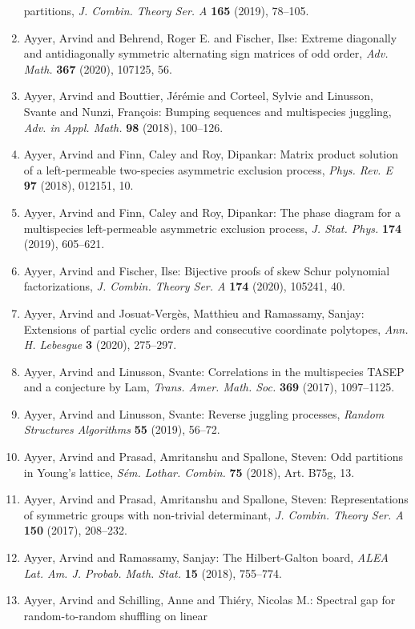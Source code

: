 \begin{enumerate}
partitions, \emph{J. Combin. Theory Ser. A} {\bf 165} (2019), 78--105.
\item Ayyer, Arvind and Behrend, Roger E. and Fischer, Ilse: Extreme diagonally and antidiagonally symmetric alternating
sign matrices of odd order, \emph{Adv. Math.} {\bf 367} (2020), 107125, 56.
\item Ayyer, Arvind and Bouttier, J\'{e}r\'{e}mie and Corteel, Sylvie and
Linusson, Svante and Nunzi, Fran\c{c}ois: Bumping sequences and multispecies juggling, \emph{Adv. in Appl. Math.} {\bf 98} (2018), 100--126.
\item Ayyer, Arvind and Finn, Caley and Roy, Dipankar: Matrix product solution of a left-permeable two-species
asymmetric exclusion process, \emph{Phys. Rev. E} {\bf 97} (2018), 012151, 10.
\item Ayyer, Arvind and Finn, Caley and Roy, Dipankar: The phase diagram for a multispecies left-permeable asymmetric
exclusion process, \emph{J. Stat. Phys.} {\bf 174} (2019), 605--621.
\item Ayyer, Arvind and Fischer, Ilse: Bijective proofs of skew {S}chur polynomial factorizations, \emph{J. Combin. Theory Ser. A} {\bf 174} (2020), 105241, 40.
\item Ayyer, Arvind and Josuat-Verg\`es, Matthieu and Ramassamy,
Sanjay: Extensions of partial cyclic orders and consecutive coordinate
polytopes, \emph{Ann. H. Lebesgue} {\bf 3} (2020), 275--297.
\item Ayyer, Arvind and Linusson, Svante: Correlations in the multispecies {TASEP} and a conjecture by
{L}am, \emph{Trans. Amer. Math. Soc.} {\bf 369} (2017), 1097--1125.
\item Ayyer, Arvind and Linusson, Svante: Reverse juggling processes, \emph{Random Structures Algorithms} {\bf 55} (2019), 56--72.
\item Ayyer, Arvind and Prasad, Amritanshu and Spallone, Steven: Odd partitions in {Y}oung's lattice, \emph{S\'{e}m. Lothar. Combin.} {\bf 75} (2018), Art. B75g, 13.
\item Ayyer, Arvind and Prasad, Amritanshu and Spallone, Steven: Representations of symmetric groups with non-trivial
determinant, \emph{J. Combin. Theory Ser. A} {\bf 150} (2017), 208--232.
\item Ayyer, Arvind and Ramassamy, Sanjay: The {H}ilbert-{G}alton board, \emph{ALEA Lat. Am. J. Probab. Math. Stat.} {\bf 15} (2018), 755--774.
\item Ayyer, Arvind and Schilling, Anne and Thi\'{e}ry, Nicolas M.: Spectral gap for random-to-random shuffling on linear

\end{enumerate}
